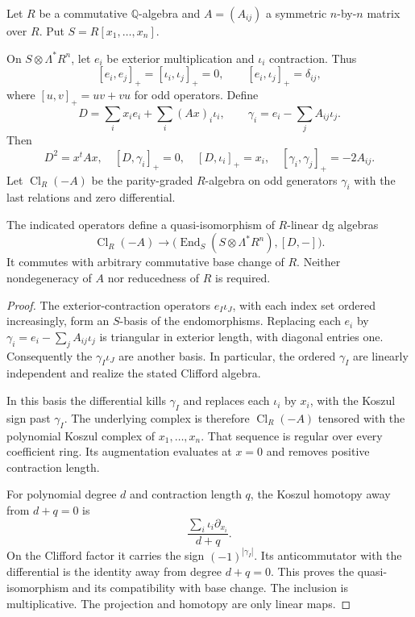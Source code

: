 Let $R$ be a commutative $\mathbb Q$-algebra and
$A=(A_{ij})$ a symmetric $n$-by-$n$ matrix over $R$.
Put $S=R[x_1,\ldots,x_n]$.

On $S\otimes\Lambda^*R^n$, let $e_i$ be exterior
multiplication and $\iota_i$ contraction. Thus
\[
 [e_i,e_j]_+=[\iota_i,\iota_j]_+=0,
 \qquad [e_i,\iota_j]_+=\delta_{ij},
\]
where $[u,v]_+=uv+vu$ for odd operators.
Define
\begin{equation}\label{mc:tcrm:eq:quadratic-object}
 D=\sum_i x_i e_i+\sum_i(Ax)_i\iota_i,
 \qquad
 \gamma_i=e_i-\sum_jA_{ij}\iota_j.
\end{equation}
Then
\begin{equation}\label{mc:tcrm:eq:operator-relations}
 D^2=x^tAx,\quad [D,\gamma_i]_+=0,\quad
 [D,\iota_i]_+=x_i,\quad
 [\gamma_i,\gamma_j]_+=-2A_{ij}.
\end{equation}
Let $\operatorname{Cl}_R(-A)$ be the parity-graded
$R$-algebra on odd generators $\gamma_i$ with the last
relations and zero differential.

\begin{theorem}\label{mc:tcrm:thm:Clifford}
The indicated operators define a quasi-isomorphism
of $R$-linear dg algebras
\begin{equation}\label{mc:tcrm:eq:Clifford-map}
 \operatorname{Cl}_R(-A)\longrightarrow
 \bigl(\operatorname{End}_S(S\otimes\Lambda^*R^n),[D,-]\bigr).
\end{equation}
It commutes with arbitrary commutative base change of
$R$. Neither nondegeneracy of $A$ nor reducedness of
$R$ is required.
\end{theorem}

\begin{proof}
The exterior-contraction operators $e_I\iota_J$, with
each index set ordered increasingly, form an $S$-basis
of the endomorphisms. Replacing each $e_i$ by
$\gamma_i=e_i-\sum_jA_{ij}\iota_j$ is triangular in
exterior length, with diagonal entries one.
Consequently the $\gamma_I\iota_J$ are another basis.
In particular, the ordered $\gamma_I$ are linearly
independent and realize the stated Clifford algebra.

In this basis the differential kills $\gamma_I$ and
replaces each $\iota_i$ by $x_i$, with the Koszul
sign past $\gamma_I$. The underlying complex is
therefore $\operatorname{Cl}_R(-A)$ tensored with
the polynomial Koszul complex of $x_1,\ldots,x_n$.
That sequence is regular over every coefficient ring.
Its augmentation evaluates at $x=0$ and removes
positive contraction length.

For polynomial degree $d$ and contraction length $q$,
the Koszul homotopy away from $d+q=0$ is
\[
 \frac{\sum_i\iota_i\partial_{x_i}}{d+q}.
\]
On the Clifford factor it carries the sign $(-1)^{|\gamma_I|}$.
Its anticommutator with the differential is the
identity away from degree $d+q=0$.
This proves the quasi-isomorphism and its compatibility
with base change. The inclusion is multiplicative.
The projection and homotopy are only linear maps.
\end{proof}

